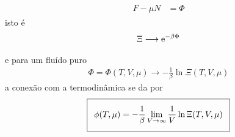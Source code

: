 \begin{prob}
\begin{sol}
\begin{align}
\begin{split}
        F-\mu N&=\Phi
      \end{split}
    \end{align}
    isto é
    \begin{align}
      \Xi\longrightarrow \mathrm{e}^{-\beta\Phi}
    \end{align}
  \end{sol}
  e para um fluído puro
  \begin{align}
    \Phi=\Phi(T,V,\mu)\to -\frac{1}{\beta}\ln\Xi(T,V,\mu)
  \end{align}
  a conexão com a termodinâmica se da por
  \begin{align}
    \addtolength{\fboxsep}{5pt}
    \boxed{
      \begin{gathered}
        \phi(T,\mu)=-\frac{1}{\beta}\lim_{V\to\infty}\frac{1}{V}\ln\Xi(T,V,\mu)
      \end{gathered}
    }
  \end{align}
\end{prob}
